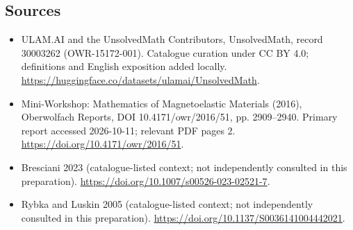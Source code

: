 \documentclass[11pt]{article}
\begin{document}
\subsection{Sources}
\begin{itemize}
\item[\hypertarget{source:30003262:1}{S1}] ULAM.AI and the UnsolvedMath Contributors, UnsolvedMath, record 30003262 (OWR-15172-001). Catalogue curation under CC BY 4.0; definitions and English exposition added locally.
\url{https://huggingface.co/datasets/ulamai/UnsolvedMath}.
\item[\hypertarget{source:30003262:2}{S2}] Mini-Workshop: Mathematics of Magnetoelastic Materials (2016), Oberwolfach Reports, DOI 10.4171/owr/2016/51, pp. 2909--2940. Primary report accessed 2026-10-11; relevant PDF pages 2.
\url{https://doi.org/10.4171/owr/2016/51}.
\item[\hypertarget{source:30003262:3}{S3}] Bresciani 2023 (catalogue-listed context; not independently consulted in this preparation).
\url{https://doi.org/10.1007/s00526-023-02521-7}.
\item[\hypertarget{source:30003262:4}{S4}] Rybka and Luskin 2005 (catalogue-listed context; not independently consulted in this preparation).
\url{https://doi.org/10.1137/S0036141004442021}.
\end{itemize}
\label{end:30003262}
\end{document}
